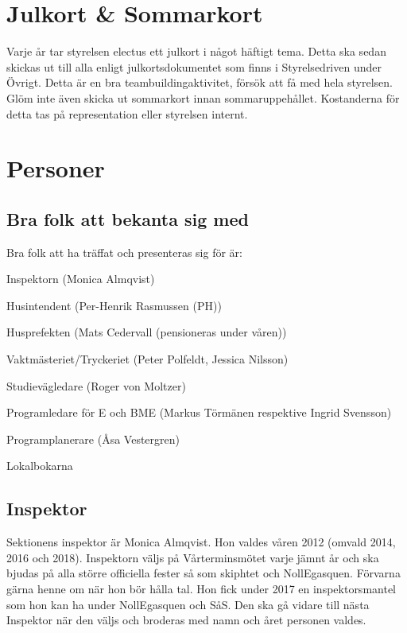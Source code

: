 \documentclass[10pt]{article}
\begin{document}
    \section{Julkort \& Sommarkort}
    
    Varje år tar styrelsen electus ett julkort i något häftigt tema. Detta ska sedan skickas ut till alla enligt julkortsdokumentet som finns i Styrelsedriven under Övrigt. Detta är en bra teambuildingaktivitet, försök att få med hela styrelsen. Glöm inte även skicka ut sommarkort innan sommaruppehållet. Kostanderna för detta tas på representation eller styrelsen internt.
    
    \section{Personer}
    
    \subsection{Bra folk att bekanta sig med}
    
    Bra folk att ha träffat och presenteras sig för är:
    \begin{dashlist}
    \item Inspektorn (Monica Almqvist)
    \item Husintendent (Per-Henrik Rasmussen (PH))
    \item Husprefekten (Mats Cedervall (pensioneras under våren))
    \item Vaktmästeriet/Tryckeriet (Peter Polfeldt, Jessica Nilsson)
    \item Studievägledare (Roger von Moltzer)
    \item Programledare för E och BME (Markus Törmänen respektive Ingrid Svensson)
    \item Programplanerare (Åsa Vestergren)
    \item Lokalbokarna
    \end{dashlist}
    
    \subsection{Inspektor}
    
    Sektionens inspektor är Monica Almqvist. Hon valdes våren 2012 (omvald 2014, 2016 och 2018). Inspektorn väljs på Vårterminsmötet varje jämnt år och ska bjudas på alla större officiella fester så som skiphtet och NollEgasquen. Förvarna gärna henne om när hon bör hålla tal. Hon fick under 2017 en inspektorsmantel som hon kan ha under NollEgasquen och SåS. Den ska gå vidare till nästa Inspektor när den väljs och broderas med namn och året personen valdes.
    
\end{document}
